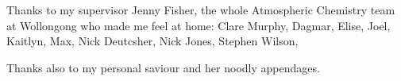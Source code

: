 \begin{acknowledgements}
  \addchaptertocentry{\acknowledgementname} %
  
  Thanks to my supervisor Jenny Fisher, the whole Atmospheric Chemistry team at Wollongong who made me feel at home: Clare Murphy, Dagmar, Elise, Joel, Kaitlyn, Max, Nick Deutcsher, Nick Jones, Stephen Wilson, 

  Thanks also to my personal saviour and her noodly appendages.

\end{acknowledgements}